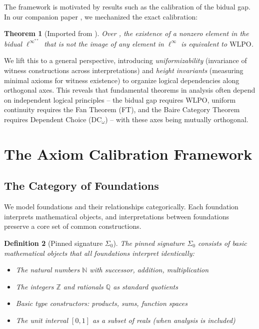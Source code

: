 \documentclass[11pt]{article}
\newtheorem{theorem}{Theorem}[section]
\newtheorem{definition}[theorem]{Definition}
\newcommand{\N}{\mathbb{N}}
\newcommand{\WLPO}{\mathrm{WLPO}}
\newcommand{\DCw}{\mathrm{DC}_\omega}
\newcommand{\BISH}{\mathrm{BISH}}
\newcommand{\SigmaZero}{\Sigma_{0}}
\newcommand{\linf}{\ell^\infty}
\begin{document}
The framework is motivated by results such as the calibration of the bidual gap. In our companion paper \cite{Paper2}, we mechanized the exact calibration:

\begin{theorem}[Imported from \cite{Paper2}]\label{thm:paper2}
Over \BISH, the existence of a nonzero element in the bidual $\linf^{**}$ that is not the image of any element in $\linf$ is equivalent to $\WLPO$.
\end{theorem}

We lift this to a general perspective, introducing \emph{uniformizability} (invariance of witness constructions across interpretations) and \emph{height invariants} (measuring minimal axioms for witness existence) to organize logical dependencies along orthogonal axes. This reveals that fundamental theorems in analysis often depend on independent logical principles -- the bidual gap requires WLPO, uniform continuity requires the Fan Theorem (FT), and the Baire Category Theorem requires Dependent Choice ($\DCw$) -- with these axes being mutually orthogonal.

\section{The Axiom Calibration Framework}

\subsection{The Category of Foundations}

We model foundations and their relationships categorically. Each foundation interprets mathematical objects, and interpretations between foundations preserve a core set of common constructions.

\begin{definition}[Pinned signature \(\SigmaZero\)]
The \emph{pinned signature} $\SigmaZero$ consists of basic mathematical objects that all foundations interpret identically:
\begin{itemize}
\item The natural numbers $\N$ with successor, addition, multiplication
\item The integers $\mathbb{Z}$ and rationals $\mathbb{Q}$ as standard quotients
\item Basic type constructors: products, sums, function spaces
\item The unit interval $[0,1]$ as a subset of reals (when analysis is included)
\end{itemize}
\end{definition}
\end{document}
